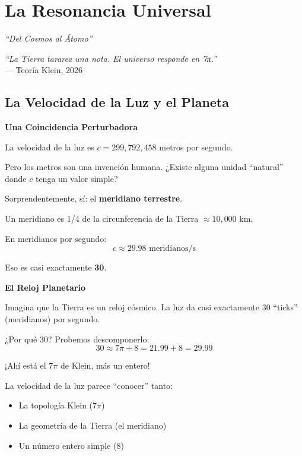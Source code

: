 \chapter{La Resonancia Universal}
\label{cap:resonancia}

\begin{center}
\textit{``Del Cosmos al Átomo''}
\end{center}

\vspace{0.5cm}

\begin{tcolorbox}[colback=white, colframe=kleinblue, boxrule=2pt]
\centering
\textit{``La Tierra tararea una nota. El universo responde en 7π.''}\\
--- Teoría Klein, 2026
\end{tcolorbox}


\section{La Velocidad de la Luz y el Planeta}

\begin{nivelconceptual}
\textbf{Una Coincidencia Perturbadora}

La velocidad de la luz es $c = 299,792,458$ metros por segundo.

Pero los metros son una invención humana.
¿Existe alguna unidad ``natural'' donde $c$ tenga un valor simple?

Sorprendentemente, sí: el \textbf{meridiano terrestre}.

Un meridiano es 1/4 de la circunferencia de la Tierra $\approx 10,000$ km.

En meridianos por segundo:
\[c \approx 29.98 \text{ meridianos/s}\]

Eso es casi exactamente \textbf{30}.
\end{nivelconceptual}

\begin{analogiabox}
\textbf{El Reloj Planetario}

Imagina que la Tierra es un reloj cósmico.
La luz da casi exactamente 30 ``ticks'' (meridianos) por segundo.

¿Por qué 30? Probemos descomponerlo:
\[30 \approx 7\pi + 8 = 21.99 + 8 = 29.99\]

¡Ahí está el $7\pi$ de Klein, más un entero!

La velocidad de la luz parece ``conocer'' tanto:
\begin{itemize}
    \item La topología Klein ($7\pi$)
    \item La geometría de la Tierra (el meridiano)
    \item Un número entero simple (8)
\end{itemize}
\end{analogiabox}

